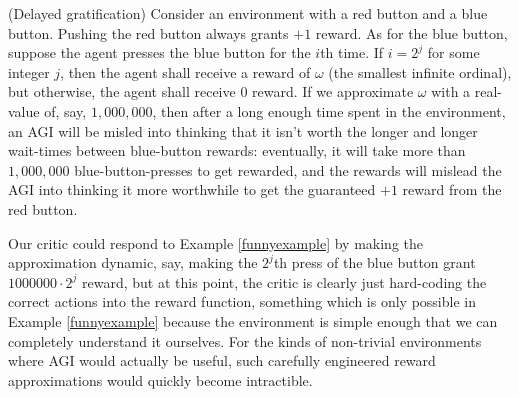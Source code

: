 \documentclass[twoside,11pt]{article}
\begin{document}
\begin{example}
\label{funnyexample}
(Delayed gratification)
Consider an environment with a red button and a blue button.
Pushing the red button always grants $+1$ reward.
As for the blue button, suppose the agent presses the blue button for the
$i$th time. If $i=2^j$ for some integer $j$, then the agent shall receive a
reward of $\omega$ (the smallest infinite ordinal), but otherwise, the agent
shall receive $0$ reward.
If we approximate $\omega$ with a real-value of, say, $1,000,000$,
then after a long enough time spent in the environment, an AGI will be misled into
thinking that it isn't worth the longer and longer wait-times between blue-button
rewards: eventually, it will take more than $1,000,000$ blue-button-presses to get
rewarded, and the rewards will mislead the AGI into thinking
it more worthwhile to get the guaranteed $+1$ reward from the red button.
\end{example}

Our critic could respond to Example \ref{funnyexample}
by making the approximation dynamic, say, making the
$2^j$th press of the blue button grant $1000000\cdot 2^j$ reward, but at this point,
the critic is clearly just hard-coding the correct actions into the reward function,
something which is only possible in Example \ref{funnyexample} because the environment
is simple enough that we can completely understand it ourselves. For the
kinds of non-trivial environments where AGI would actually be useful, such carefully
engineered reward approximations would quickly become intractible.

\end{document}
